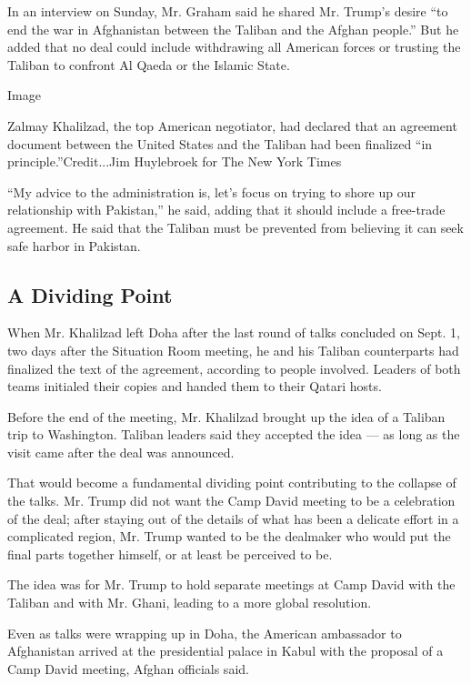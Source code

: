 In an interview on Sunday, Mr. Graham said he shared Mr. Trump's desire
``to end the war in Afghanistan between the Taliban and the Afghan
people.'' But he added that no deal could include withdrawing all
American forces or trusting the Taliban to confront Al Qaeda or the
Islamic State.

Image

Zalmay Khalilzad, the top American negotiator, had declared that an
agreement document between the United States and the Taliban had been
finalized ``in principle.''Credit...Jim Huylebroek for The New York
Times

``My advice to the administration is, let's focus on trying to shore up
our relationship with Pakistan,'' he said, adding that it should include
a free-trade agreement. He said that the Taliban must be prevented from
believing it can seek safe harbor in Pakistan.

\hypertarget{a-dividing-point}{%
\subsection{A Dividing Point}\label{a-dividing-point}}

When Mr. Khalilzad left Doha after the last round of talks concluded on
Sept. 1, two days after the Situation Room meeting, he and his Taliban
counterparts had finalized the text of the agreement, according to
people involved. Leaders of both teams initialed their copies and handed
them to their Qatari hosts.

Before the end of the meeting, Mr. Khalilzad brought up the idea of a
Taliban trip to Washington. Taliban leaders said they accepted the idea
--- as long as the visit came after the deal was announced.

That would become a fundamental dividing point contributing to the
collapse of the talks. Mr. Trump did not want the Camp David meeting to
be a celebration of the deal; after staying out of the details of what
has been a delicate effort in a complicated region, Mr. Trump wanted to
be the dealmaker who would put the final parts together himself, or at
least be perceived to be.

The idea was for Mr. Trump to hold separate meetings at Camp David with
the Taliban and with Mr. Ghani, leading to a more global resolution.

Even as talks were wrapping up in Doha, the American ambassador to
Afghanistan arrived at the presidential palace in Kabul with the
proposal of a Camp David meeting, Afghan officials said.

